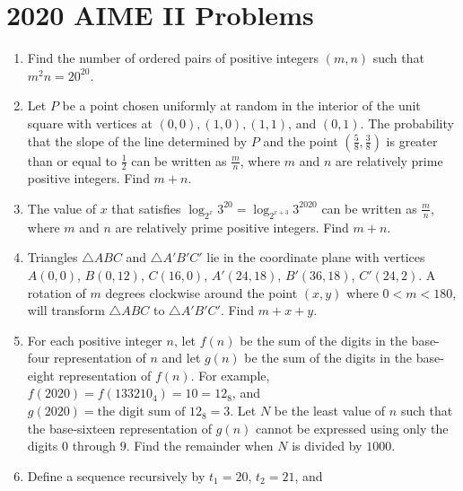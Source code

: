 \documentclass{article}
\begin{document}
\newpage\section*{2020 AIME II Problems}

\begin{enumerate}[label=\arabic*., itemsep=0.5em]
\item Find the number of ordered pairs of positive integers \((m,n)\) such that \({m^2n = 20 ^{20}}\).\par \vspace{0.5em}\item Let \(P\) be a point chosen uniformly at random in the interior of the unit square with vertices at \((0,0), (1,0), (1,1)\), and \((0,1)\). The probability that the slope of the line determined by \(P\) and the point \(\left(\frac58, \frac38 \right)\) is greater than or equal to \(\frac12\) can be written as \(\frac{m}{n}\), where \(m\) and \(n\) are relatively prime positive integers. Find \(m+n\).\par \vspace{0.5em}\item The value of \(x\) that satisfies \(\log_{2^x} 3^{20} = \log_{2^{x+3}} 3^{2020}\) can be written as \(\frac{m}{n}\), where \(m\) and \(n\) are relatively prime positive integers. Find \(m+n\).\par \vspace{0.5em}\item Triangles \(\triangle ABC\) and \(\triangle A'B'C'\) lie in the coordinate plane with vertices \(A(0,0)\), \(B(0,12)\), \(C(16,0)\), \(A'(24,18)\), \(B'(36,18)\), \(C'(24,2)\). A rotation of \(m\) degrees clockwise around the point \((x,y)\) where \(0<m<180\), will transform \(\triangle ABC\) to \(\triangle A'B'C'\). Find \(m+x+y\).\par \vspace{0.5em}\item For each positive integer \(n\), let \(f(n)\) be the sum of the digits in the base-four representation of \(n\) and let \(g(n)\) be the sum of the digits in the base-eight representation of \(f(n)\). For example, \(f(2020) = f(133210_{\text{4}}) = 10 = 12_{\text{8}}\), and \(g(2020) = \text{the digit sum of }12_{\text{8}} = 3\). Let \(N\) be the least value of \(n\) such that the base-sixteen representation of \(g(n)\) cannot be expressed using only the digits \(0\) through \(9\). Find the remainder when \(N\) is divided by \(1000\).\par \vspace{0.5em}\item Define a sequence recursively by \(t_1 = 20\), \(t_2 = 21\), and

\end{enumerate}
\end{document}
